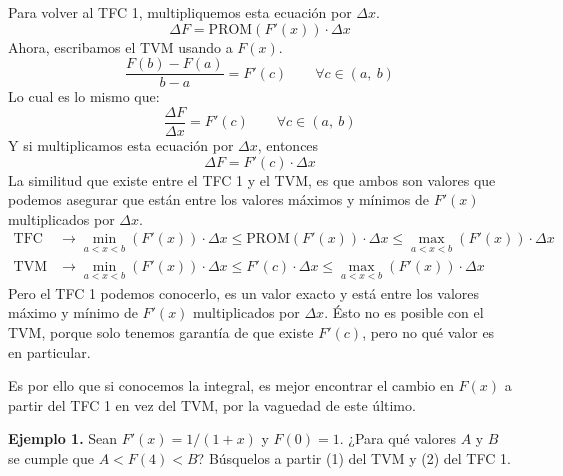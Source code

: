 \documentclass[12pt]{article}
\begin{document}
Para volver al TFC 1, multipliquemos esta ecuación por $\Delta x$.
\[
  \Delta F = \text{PROM}(F'(x)) \cdot \Delta x
\]
Ahora, escribamos el TVM usando a $F(x)$.
\[
  \frac{F(b) - F(a)}{b - a} = F'(c) \qquad \forall c \in (a, \ b)
\]
Lo cual es lo mismo que:
\[
  \frac{\Delta F}{\Delta x} = F'(c) \qquad \forall c \in (a, \ b)
\]
Y si multiplicamos esta ecuación por $\Delta x$, entonces
\[
  \Delta F = F'(c) \cdot \Delta x
\]
La similitud que existe entre el TFC 1 y el TVM, es que ambos son valores que podemos asegurar que están entre los valores máximos y mínimos de $F'(x)$ multiplicados por $\Delta x$.
\begin{align*}
\text{TFC 1} &\longrightarrow
\min_{a < x < b}(F'(x)) \cdot \Delta x \leq
\text{PROM}(F'(x)) \cdot \Delta x \leq
\max_{a < x < b}(F'(x)) \cdot \Delta x
\\
\text{TVM} &\longrightarrow
\min_{a < x < b}(F'(x)) \cdot \Delta x \leq
F'(c) \cdot \Delta x \leq
\max_{a < x < b}(F'(x)) \cdot \Delta x
\end{align*}
Pero el TFC 1 podemos conocerlo, es un valor exacto y está entre los valores máximo y mínimo  de $F'(x)$ multiplicados por $\Delta x$. Ésto no es posible con el TVM, porque solo tenemos garantía de que existe $F'(c)$, pero no qué valor es en particular.

Es por ello que si conocemos la integral, es mejor encontrar el cambio en $F(x)$ a partir del TFC 1 en vez del TVM, por la vaguedad de este último.

\newpage

\textbf{Ejemplo 1.} \quad Sean $F'(x) = 1/(1 + x)$ y $F(0) = 1$. ¿Para qué valores $A$ y $B$ se cumple que $A < F(4) < B$? Búsquelos a partir (1) del TVM y (2) del TFC 1.
\end{document}
